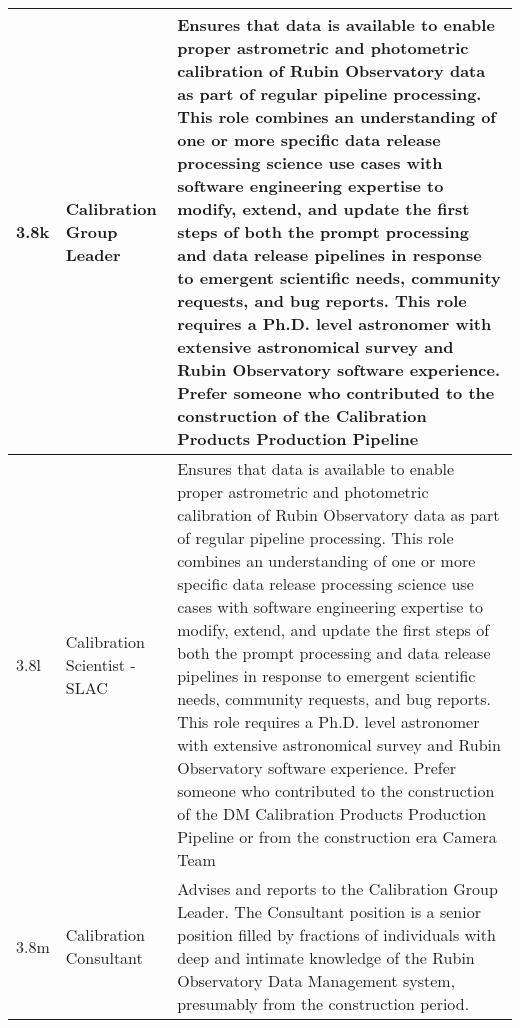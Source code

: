 \begin{longtable} {|p{}|p{}|p{}|}
{3.8k}&{Calibration Group Leader}&{Ensures that data is available to enable proper astrometric and photometric calibration of Rubin Observatory data as part of regular pipeline processing. This role combines an understanding of one or more specific data release processing science use cases with software engineering expertise to modify, extend, and update the first steps of both the prompt processing and data release pipelines in response to emergent scientific needs, community requests, and bug reports. This role requires a Ph.D. level astronomer with extensive astronomical survey and Rubin Observatory software experience. Prefer someone who contributed to the construction of the Calibration Products Production Pipeline} \\ \hline
{3.8l}&{Calibration Scientist - SLAC}&{Ensures that data is available to enable proper astrometric and photometric calibration of Rubin Observatory data as part of regular pipeline processing. This role combines an understanding of one or more specific data release processing science use cases with software engineering expertise to modify, extend, and update the first steps of both the prompt processing and data release pipelines in response to emergent scientific needs, community requests, and bug reports. This role requires a Ph.D. level astronomer with extensive astronomical survey and Rubin Observatory software experience. Prefer someone who contributed to the construction of the DM Calibration Products Production Pipeline or from the construction era Camera Team} \\ \hline
{3.8m}&{Calibration Consultant}&{Advises and reports to the Calibration Group Leader. The Consultant position is a senior position filled by fractions of individuals with deep and intimate knowledge of the Rubin Observatory Data Management system, presumably from the construction period.} \\ \hline
\end{longtable} \normalsize
